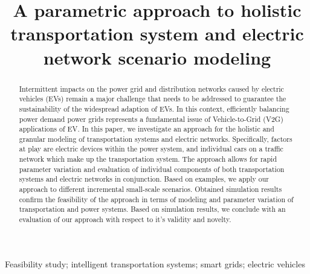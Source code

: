 \title{A parametric approach to holistic transportation system and electric network scenario modeling}

\author{
	\and
}

\maketitle

\begin{abstract}

Intermittent impacts on the power grid and distribution networks caused by electric vehicles (EVs) remain a major challenge that needs to be addressed to guarantee the sustainability of the widespread adaption of EVs. In this context, efficiently balancing power demand power grids represents a fundamental issue of Vehicle-to-Grid (V2G) applications of EV. In this paper, we investigate an approach for the holistic and granular modeling of transportation systems and electric networks. Specifically, factors at play are electric devices within the power system, and individual cars on a traffic network which make up the transportation system. The approach allows for rapid parameter variation and evaluation of individual components of both transportation systems and electric networks in conjunction. Based on examples, we apply our approach to different incremental small-scale scenarios. Obtained simulation results confirm the feasibility of the approach in terms of modeling and parameter variation of transportation and power systems. Based on simulation results, we conclude with an evaluation of our approach with respect to it's validity and novelty.

\end{abstract}

\begin{keywords}
	
Feasibility study; intelligent transportation systems; smart grids; electric vehicles 

\end{keywords}